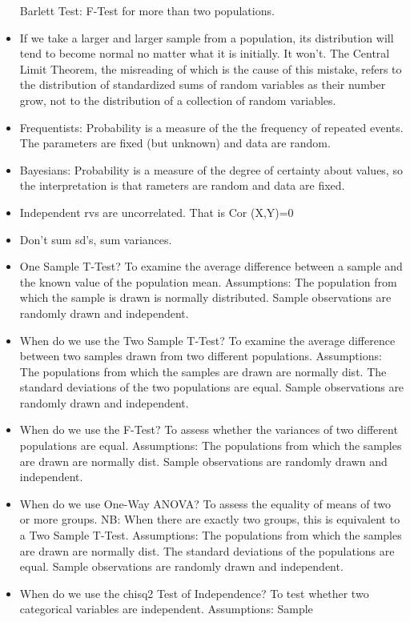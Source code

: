 \documentclass[]{book}
\theoremstyle{definition}
\theoremstyle{definition}
\theoremstyle{definition}
\theoremstyle{remark}
\begin{document}
\begin{itemize}
  Barlett Test: F-Test for more than two populations.
\item
  If we take a larger and larger sample from a population, its
  distribution will tend to become normal no matter what it is
  initially. It won't. The Central Limit Theorem, the misreading of
  which is the cause of this mistake, refers to the distribution of
  standardized sums of random variables as their number grow, not to the
  distribution of a collection of random variables.
\item
  Frequentists: Probability is a measure of the the frequency of
  repeated events. The parameters are fixed (but unknown) and data are
  random.
\item
  Bayesians: Probability is a measure of the degree of certainty about
  values, so the interpretation is that rameters are random and data are
  fixed.
\item
  Independent rvs are uncorrelated. That is Cor (X,Y)=0
\item
  Don't sum sd's, sum variances.
\item
  One Sample T-Test? To examine the average difference between a sample
  and the known value of the population mean. Assumptions: The
  population from which the sample is drawn is normally distributed.
  Sample observations are randomly drawn and independent.
\item
  When do we use the Two Sample T-Test? To examine the average
  difference between two samples drawn from two different populations.
  Assumptions: The populations from which the samples are drawn are
  normally dist. The standard deviations of the two populations are
  equal. Sample observations are randomly drawn and independent.
\item
  When do we use the F-Test? To assess whether the variances of two
  different populations are equal. Assumptions: The populations from
  which the samples are drawn are normally dist. Sample observations are
  randomly drawn and independent.
\item
  When do we use One-Way ANOVA? To assess the equality of means of two
  or more groups. NB: When there are exactly two groups, this is
  equivalent to a Two Sample T-Test. Assumptions: The populations from
  which the samples are drawn are normally dist. The standard deviations
  of the populations are equal. Sample observations are randomly drawn
  and independent.
\item
  When do we use the chisq2 Test of Independence? To test whether two
  categorical variables are independent. Assumptions: Sample

\end{itemize}
\end{document}
